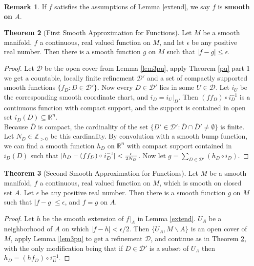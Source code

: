 \documentclass{article}
\theoremstyle{definition}
\newtheorem{thm}{Theorem}[section]
\newtheorem{rmk}[thm]{Remark}
\begin{document}
\begin{rmk}
    If $f$ satisfies the assumptions of Lemma \ref{extend}, we say $f$ is {\bf smooth on $A$}.
\end{rmk}

\begin{thm}[First Smooth Approximation for Functions]\label{approx1}
Let $M$ be a smooth manifold, $f$ a continuous, real valued function on $M$, and let $\epsilon$ be any positive real number. Then there is a smooth function $g$ on $M$ such that $|f-g|\leq \epsilon$.
\end{thm}

\begin{proof} Let $\mathcal{D}$ be the open cover from Lemma \ref{lem3pu}, apply Theorem \ref{pu} part 1 we get a countable, locally finite refinement $\mathcal{D}'$ and a set of compactly supported smooth functions $\{f_D: D\in \mathcal{D}'\}$. Now every $D\in\mathcal{D}'$ lies in some $U\in\mathcal{D}$. Let $i_U$ be the corresponding smooth coordinate chart, and $i_D=i_U|_D$. Then $(ff_D)\circ i_D^{-1}$ is a continuous function with compact support, and the support is contained in open set $i_D(D)\subseteq \mathbb{R}^n$.\\

Because $\overline{D}$ is compact, the cardinality of the set $\{D'\in\mathcal{D}': \overline{D}\cap\overline{D}'\not=\emptyset\}$ is finite. Let $N_D\in\mathbb{Z}_{>0}$ be this cardinality. By convolution with a smooth bump function, we can find a smooth function $h_D$ on $\mathbb{R}^n$ with compact support contained in $i_D(D)$ such that $|h_D-(ff_D)\circ i_D^{-1}|<{\epsilon\over 2N_D}$. Now let $g=\sum_{D\in\mathcal{D}'}(h_D\circ i_D)$.
\end{proof}


\begin{thm}[Second Smooth Approximation for Functions]\label{approx2}
Let $M$ be a smooth manifold, $f$ a continuous, real valued function on $M$, which is smooth on closed set $A$. Let $\epsilon$ be any positive real number. Then there is a smooth function $g$ on $M$ such that $|f-g|\leq \epsilon$, and $f=g$ on $A$.
\end{thm}

\begin{proof}
    Let $h$ be the smooth extension of $f|_A$ in Lemma \ref{extend}. $U_A$ be a neighborhood of $A$ on which $|f-h|<\epsilon/2$. Then $\{U_A, M\backslash A\}$ is an open cover of $M$, apply Lemma \ref{lem3pu} to get a refinement $\mathcal{D}$, and continue as in Theorem \ref{approx1}, with the only modification being that if $D\in\mathcal{D}'$ is a subset of $U_A$ then $h_D=(hf_D)\circ i_D^{-1}$.
\end{proof}
\end{document}
